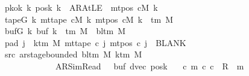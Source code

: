 \begin{isabellebody}
\ \ \ \ \ \ \ pkok{\isacharcolon}{\kern0pt}\ {\isachardoublequoteopen}{\isasymAnd}k{\isachardot}{\kern0pt}\ posk{}\ k\ {\isacharequal}{\kern0pt}\ AR{\isacharunderscore}{\kern0pt}AtLE\ {\isasymlongleftrightarrow}\ mt{\isacharunderscore}{\kern0pt}pos\ cM\ k\ {\isacharequal}{\kern0pt}\ {}{\isachardoublequoteclose}\isanewline
\ \ \ \ \ \ \ tapeG{\isacharcolon}{\kern0pt}\ {\isachardoublequoteopen}{\isasymAnd}k{\isachardot}{\kern0pt}\ mt{\isacharunderscore}{\kern0pt}tape\ cM\ k\ {\isacharparenleft}{\kern0pt}mt{\isacharunderscore}{\kern0pt}pos\ cM\ k{\isacharparenright}{\kern0pt}\ {\isasymin}\ {\isasymGamma}{\isacharunderscore}{\kern0pt}tm\ M{\isachardoublequoteclose}\isanewline
\ \ \ \ \ \ \ bufG{\isacharcolon}{\kern0pt}\ {\isachardoublequoteopen}{\isasymAnd}k{\isachardot}{\kern0pt}\ buf{}\ k\ {\isasymin}\ {\isasymGamma}{\isacharunderscore}{\kern0pt}tm\ M\ {\isasymunion}\ {\isacharbraceleft}{\kern0pt}bl{\isacharunderscore}{\kern0pt}tm\ M{\isacharbraceright}{\kern0pt}{\isachardoublequoteclose}\isanewline
\ \ \ \ \ \ \ pad{}{\isacharcolon}{\kern0pt}\ {\isachardoublequoteopen}{\isasymforall}j\ {\isasymge}\ k{\isacharunderscore}{\kern0pt}tm\ M{\isachardot}{\kern0pt}\ mt{\isacharunderscore}{\kern0pt}tape\ c{}\ j\ {\isacharparenleft}{\kern0pt}mt{\isacharunderscore}{\kern0pt}pos\ c{}\ j{\isacharparenright}{\kern0pt}\ {\isacharequal}{\kern0pt}\ BLANK{}{\isachardoublequoteclose}\isanewline
\ \ \ \ \ \ \ src{}{\isacharcolon}{\kern0pt}\ {\isachardoublequoteopen}ar{\isacharunderscore}{\kern0pt}stage{\isacharunderscore}{\kern0pt}bounded\ {\isacharparenleft}{\kern0pt}bl{\isacharunderscore}{\kern0pt}tm\ M{\isacharparenright}{\kern0pt}\ {\isacharparenleft}{\kern0pt}k{\isacharunderscore}{\kern0pt}tm\ M{\isacharparenright}{\kern0pt}\isanewline
\ \ \ \ \ \ \ \ \ \ \ \ \ \ \ \ \ \ \ {\isacharparenleft}{\kern0pt}AR{\isacharunderscore}{\kern0pt}SimRead{\isacharcomma}{\kern0pt}\ {}{\isacharcomma}{\kern0pt}\ {}{\isacharcomma}{\kern0pt}\ buf{}{\isacharcomma}{\kern0pt}\ dvec{\isacharcomma}{\kern0pt}\ posk{}{\isacharparenright}{\kern0pt}{\isachardoublequoteclose}\isanewline
\ \ \ {\isachardoublequoteopen}{\isasymexists}c\ m{\isachardot}{\kern0pt}\ {\isacharparenleft}{\kern0pt}c{}{\isacharcomma}{\kern0pt}\ c{\isacharparenright}{\kern0pt}\ {\isasymin}\ R{\isacharprime}{\kern0pt}\ {\isacharcircum}{\kern0pt}{\isacharcircum}{\kern0pt}\ m\isanewline

\end{isabellebody}
